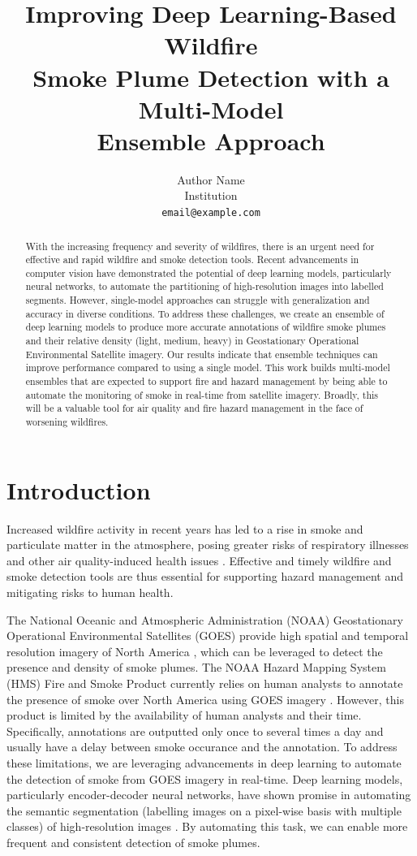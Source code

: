 \documentclass{article}
\title{Improving Deep Learning-Based Wildfire\\ Smoke Plume Detection with a Multi-Model\\ Ensemble Approach}
\author{Author Name \\
Institution \\
\texttt{email@example.com}
}
\begin{document}
\maketitle
\begin{abstract}
With the increasing frequency and severity of wildfires, there is an urgent need for effective and rapid wildfire and smoke detection tools. Recent advancements in computer vision have demonstrated the potential of deep learning models, particularly neural networks, to automate the partitioning of high-resolution images into labelled segments. However, single-model approaches can struggle with generalization and accuracy in diverse conditions. To address these challenges, we create an ensemble of deep learning models to produce more accurate annotations of wildfire smoke plumes and their relative density (light, medium, heavy) in Geostationary Operational Environmental Satellite imagery. Our results indicate that ensemble techniques can improve performance compared to using a single model. This work builds multi-model ensembles that are expected to support fire and hazard management by being able to automate the monitoring of smoke in real-time from satellite imagery. Broadly, this will be a valuable tool for air quality and fire hazard management in the face of worsening wildfires.
\end{abstract}

\section{Introduction}
Increased wildfire activity in recent years has led to a rise in smoke and particulate matter in the atmosphere, posing greater risks of respiratory illnesses and other air quality-induced health issues \citep{wildfire-risk}. Effective and timely wildfire and smoke detection tools are thus essential for supporting hazard management and mitigating risks to human health. 

The National Oceanic and Atmospheric Administration (NOAA) Geostationary Operational Environmental Satellites (GOES) provide high spatial and temporal resolution imagery of North America \citep{GOESbook}, which can be leveraged to detect the presence and density of smoke plumes. The NOAA Hazard Mapping System (HMS) Fire and Smoke Product currently relies on human analysts to annotate the presence of smoke over North America using GOES imagery \citep{hms}. However, this product is limited by the availability of human analysts and their time. Specifically, annotations are outputted only once to several times a day and usually have a delay between smoke occurance and the annotation. To address these limitations, we are leveraging advancements in deep learning to automate the detection of smoke from GOES imagery in real-time. Deep learning models, particularly encoder-decoder neural networks, have shown promise in automating the semantic segmentation (labelling images on a pixel-wise basis with multiple classes) of high-resolution images \citep{cv-segmentation-review}. By automating this task, we can enable more frequent and consistent detection of smoke plumes.
\end{document}
